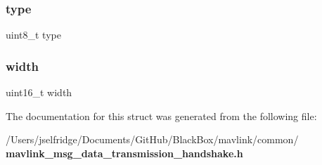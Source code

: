 \subsubsection{type}
{\footnotesize\ttfamily uint8\+\_\+t type}

\mbox{\label{struct____mavlink__data__transmission__handshake__t_ad0eab1042455a2067c812ab8071d5376}} 
\subsubsection{width}
{\footnotesize\ttfamily uint16\+\_\+t width}



The documentation for this struct was generated from the following file\+:\begin{DoxyCompactItemize}
\item 
/\+Users/jselfridge/\+Documents/\+Git\+Hub/\+Black\+Box/mavlink/common/\textbf{ mavlink\+\_\+msg\+\_\+data\+\_\+transmission\+\_\+handshake.\+h}\end{DoxyCompactItemize}
